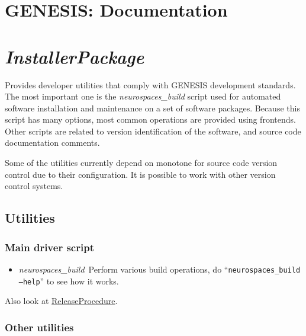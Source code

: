\documentclass[12pt]{article}
\begin{document}
\section*{GENESIS: Documentation}

\section*{\it InstallerPackage}

Provides developer utilities that comply with GENESIS development standards. The most important one is the {\it neurospaces\_build} script used for automated software installation and maintenance on a set of software packages. Because this script has many options, most common operations are provided using frontends. Other scripts are related to version identification of the software, and source code documentation comments.

Some of the utilities currently depend on monotone for source code version control due to their configuration. It is possible to work with other version control systems.

\subsection*{Utilities}

\subsubsection*{Main driver script}

\begin{itemize}
	\item {\it neurospaces\_build}\,\,\,Perform various build operations, do ``{\tt neurospaces\_build --help}'' to see how it works. 
\end{itemize} 

Also look at \href{../releaseprocedure/releaseprocedure.tex}{ReleaseProcedure}.

\subsubsection*{Other utilities}
\end{document}
